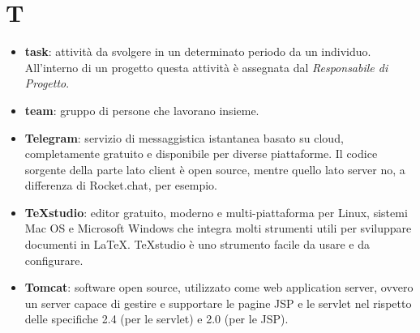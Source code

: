 \section{T}
\begin{itemize}
	\item \textbf{task}: attività da svolgere in un determinato periodo da un individuo. All'interno di un progetto questa attività è assegnata dal \textit{Responsabile di Progetto}.
	\item \textbf{team}: gruppo di persone che lavorano insieme.
	\item \textbf{Telegram}: servizio di messaggistica istantanea basato su cloud, completamente gratuito e disponibile per diverse piattaforme. Il codice sorgente della parte lato client è open source, mentre quello lato server no, a differenza di Rocket.chat, per esempio.
	\item \textbf{TeXstudio}: editor gratuito, moderno e multi-piattaforma per Linux, sistemi Mac OS e Microsoft Windows che integra molti strumenti utili per sviluppare documenti in \LaTeX. TeXstudio è uno strumento facile da usare e da configurare.
	\item \textbf{Tomcat}: software open source, utilizzato come web application server, ovvero un server capace di gestire e supportare le pagine JSP e le servlet nel rispetto delle specifiche 2.4 (per le servlet) e 2.0 (per le JSP).
\end{itemize}

